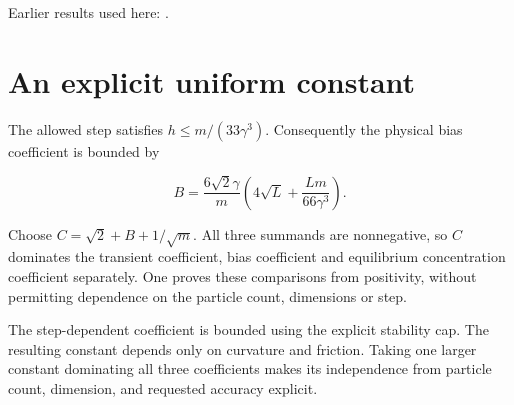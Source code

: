 \documentclass[11pt,a4paper]{article}
\begin{document}
Earlier results used here: \cite[Section~3.113.4]{LangevinLean2026Kinetic}.

\section{\texorpdfstring{An explicit uniform constant}{An explicit uniform constant}}


The allowed step satisfies \(h\le m/(33\gamma^3)\). Consequently the physical bias coefficient is bounded by

\[B=\frac{6\sqrt2\gamma}{m}\left(4\sqrt L+\frac{Lm}{66\gamma^3}\right).\]

Choose \(C=\sqrt2+B+1/\sqrt m\). All three summands are nonnegative, so \(C\) dominates the transient coefficient, bias coefficient and equilibrium concentration coefficient separately. One proves these comparisons from positivity, without permitting dependence on the particle count, dimensions or step.



The step-dependent coefficient is bounded using the explicit stability cap. The resulting constant depends only on curvature and friction. Taking one larger constant dominating all three coefficients makes its independence from particle count, dimension, and requested accuracy explicit.
\end{document}
